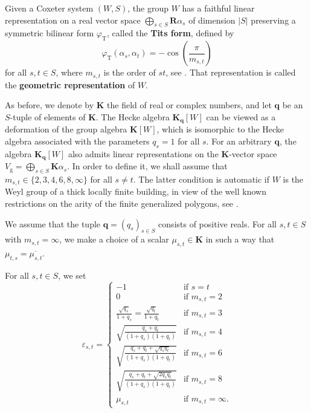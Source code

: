 \documentclass[12pt,a4paper]{amsproc}
\theoremstyle{definition}
\newcommand{\KK}{\mathbf K}
\newcommand{\RR}{\mathbf R}
\newcommand{\qq}{\mathbf q}
\begin{document}
Given a Coxeter system $(W, S)$, the group $W$ has a faithful linear representation on a real vector space $\bigoplus_{s \in S} \RR \alpha_s$ of dimension $|S|$ preserving a symmetric bilinear form $\varphi_{\mathrm T}$, called the \textbf{Tits form}, defined by 
$$\varphi_{\mathrm T}(\alpha_s, \alpha_t) = -\cos(\frac \pi {m_{s, t}})$$
for all $s, t \in S$, 
where $m_{s, t}$ is the order of $st$, see \cite[Ch.~V, \S 4]{Bour}. That representation is called the \textbf{geometric representation} of $W$. 

As before, we denote by $\KK$ the field of real or complex numbers, and let $\qq$ be an $S$-tuple of elements of $\KK$. The Hecke algebra $\KK_{\mathbf q}[W]$ can be viewed as a deformation of the group algebra $\KK[W]$, which is isomorphic to the Hecke algebra associated with the parameters $q_s = 1$ for all $s$. For an arbitrary $\qq$, the  algebra $\KK_{\mathbf q}[W]$  also admits linear representations on the $\KK$-vector space $V_{\mathrm g} = \bigoplus_{s \in S} \KK \alpha_s$. In order to define it, we 
shall assume that $m_{s, t} \in \{2, 3, 4, 6, 8, \infty\}$ for all $s \neq t$. The latter condition is automatic if $W$ is the Weyl group of a thick locally finite building, in view of the well known restrictions on the arity of the finite generalized polygons, see \cite{FeitHigman}.  

We assume that the tuple $\mathbf q = (q_s)_{s \in S}$ consists of positive reals. For all $s, t \in S$ with $m_{s, t} = \infty$, we make a choice of a scalar $\mu_{s, t} \in \KK$ in such a way that $\mu_{t, s} = \overline{\mu_{s, t}}$. 

For all $s, t \in S$, we set
\begin{equation}\label{eq:eps_st} 
\varepsilon_{s, t} = \left \{
\begin{array}{ll}
-1 & \text{if } s = t\\
0 & \text{if } m_{s, t} = 2\\
\frac{\sqrt{q_s}}{1+q_s} =  \frac{\sqrt{q_t}}{1+q_t} & \text{if } m_{s, t} = 3 \\
\sqrt{\frac{ q_s+q_t}{(1+q_s)(1+q_t)}} & \text{if } m_{s, t} = 4\\
\sqrt{\frac{ q_s+q_t+\sqrt{q_s q_t}}{(1+q_s)(1+q_t)}} & \text{if } m_{s, t} = 6\\
\sqrt{\frac{ q_s+q_t+\sqrt{2q_s q_t}}{(1+q_s)(1+q_t)}} & \text{if } m_{s, t} = 8\\
\mu_{s, t} & \text{if } m_{s, t} =\infty.
\end{array}\right.
\end{equation}	
\end{document}
